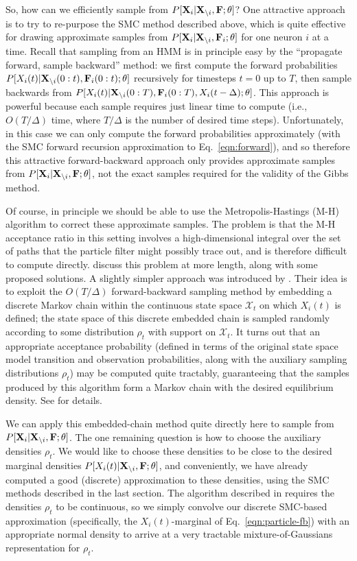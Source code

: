 \documentclass[aoas,preprint]{imsart}
\renewcommand{\i}{\backslash i}
\newcommand{\bth}{\mathbf{\theta}}
\newcommand{\bF}{{\bf F}}
\newcommand{\bX}{{\bf X}}
\begin{document}
So, how can we efficiently sample from $P[\bX_i | \bX_{\i}, \bF;
\bth]$? One attractive approach is to try to re-purpose the SMC method
described above, which is quite effective for drawing approximate
samples from $P[\bX_i | \bX_{\i}, \bF_i; \bth]$ for one neuron $i$ at
a time. Recall that sampling from an HMM is in principle easy by the
``propagate forward, sample backward'' method: we first compute the
forward probabilities $P[X_i(t) | \bX_{\i}(0:t), \bF_i(0:t); \bth]$
recursively for timesteps $t=0$ up to $T$, then sample backwards from
$P[X_i(t) | \bX_{\i}(0:T), \bF_i(0:T), X_i(t-\Delta); \bth]$. This
approach is powerful because each sample requires just linear time to
compute (i.e., $O(T/\Delta)$ time, where $T/\Delta$ is the number of
desired time steps). Unfortunately, in this case we can only compute
the forward probabilities approximately (with the SMC forward
recursion approximation to Eq.~\eqref{eqn:forward}), and so therefore
this attractive forward-backward approach only provides approximate
samples from $P[\bX_i | \bX_{\i}, \bF; \bth]$, not the exact samples
required for the validity of the Gibbs method.

Of course, in principle we should be able to use the
Metropolis-Hastings (M-H) algorithm to correct these approximate
samples. The problem is that the M-H acceptance ratio in this setting
involves a high-dimensional integral over the set of paths that the
particle filter might possibly trace out, and is therefore difficult
to compute directly. \cite{Andrieu2007} discuss this problem at more
length, along with some proposed solutions. A slightly simpler
approach was introduced by \cite{NBR03}. Their idea is to exploit the
$O(T/\Delta)$ forward-backward sampling method by embedding a discrete
Markov chain within the continuous state space $\mathcal{X}_t$ on
which $X_i(t)$ is defined; the state space of this discrete embedded
chain is sampled randomly according to some distribution $\rho_t$ with
support on $\mathcal{X}_t$. It turns out that an appropriate
acceptance probability (defined in terms of the original state space
model transition and observation probabilities, along with the
auxiliary sampling distributions $\rho_t$) may be computed quite
tractably, guaranteeing that the samples produced by this algorithm
form a Markov chain with the desired equilibrium density. See
\cite{NBR03} for details.

We can apply this embedded-chain method quite directly here to sample
from $P[\bX_i | \bX_{\i}, \bF; \bth]$. The one remaining question is
how to choose the auxiliary densities $\rho_t$. We would like to
choose these densities to be close to the desired marginal densities
$P[X_i(t) | \bX_{\i}, \bF; \bth]$, and conveniently, we have already
computed a good (discrete) approximation to these densities, using the
SMC methods described in the last section. The algorithm described in
\cite{NBR03} requires the densities $\rho_t$ to be continuous, so we
simply convolve our discrete SMC-based approximation (specifically,
the $X_i(t)$-marginal of Eq.~\eqref{eqn:particle-fb}) with an
appropriate normal density to arrive at a very tractable
mixture-of-Gaussians representation for $\rho_t$.
\end{document}
